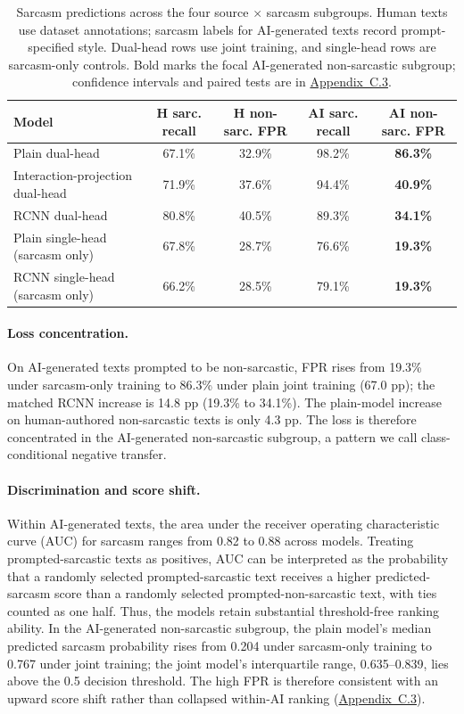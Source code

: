 \documentclass[11pt]{article}
\begin{document}
\begin{table}[t]
  \centering
  \footnotesize
  \setlength{\tabcolsep}{3pt}
  \begin{tabular}{@{}lcccc@{}}
    \toprule
    \textbf{Model} & \textbf{H sarc. recall} & \textbf{H non-sarc. FPR} & \textbf{AI sarc. recall} & \textbf{AI non-sarc. FPR} \\
    \midrule
    Plain dual-head & 67.1\% & 32.9\% & 98.2\% & \textbf{86.3\%} \\
    Interaction-projection dual-head & 71.9\% & 37.6\% & 94.4\% & \textbf{40.9\%} \\
    RCNN dual-head & 80.8\% & 40.5\% & 89.3\% & \textbf{34.1\%} \\
    Plain single-head (sarcasm only) & 67.8\% & 28.7\% & 76.6\% & \textbf{19.3\%} \\
    RCNN single-head (sarcasm only) & 66.2\% & 28.5\% & 79.1\% & \textbf{19.3\%} \\
    \bottomrule
  \end{tabular}
  \caption{Sarcasm predictions across the four source $\times$ sarcasm subgroups. Human texts use dataset annotations; sarcasm labels for AI-generated texts record prompt-specified style. Dual-head rows use joint training, and single-head rows are sarcasm-only controls. Bold marks the focal AI-generated non-sarcastic subgroup; confidence intervals and paired tests are in \hyperref[app:c3]{Appendix~C.3}.}
  \label{tab:quadrant}
\end{table}

\paragraph{Loss concentration.} On AI-generated texts prompted to be non-sarcastic, FPR rises from 19.3\% under sarcasm-only training to 86.3\% under plain joint training (67.0 pp); the matched RCNN increase is 14.8 pp (19.3\% to 34.1\%). The plain-model increase on human-authored non-sarcastic texts is only 4.3 pp. The loss is therefore concentrated in the AI-generated non-sarcastic subgroup, a pattern we call class-conditional negative transfer.

\paragraph{Discrimination and score shift.} Within AI-generated texts, the area under the receiver operating characteristic curve (AUC) for sarcasm ranges from 0.82 to 0.88 across models. Treating prompted-sarcastic texts as positives, AUC can be interpreted as the probability that a randomly selected prompted-sarcastic text receives a higher predicted-sarcasm score than a randomly selected prompted-non-sarcastic text, with ties counted as one half. Thus, the models retain substantial threshold-free ranking ability. In the AI-generated non-sarcastic subgroup, the plain model's median predicted sarcasm probability rises from 0.204 under sarcasm-only training to 0.767 under joint training; the joint model's interquartile range, 0.635--0.839, lies above the 0.5 decision threshold. The high FPR is therefore consistent with an upward score shift rather than collapsed within-AI ranking (\hyperref[app:c3]{Appendix~C.3}).
\end{document}
